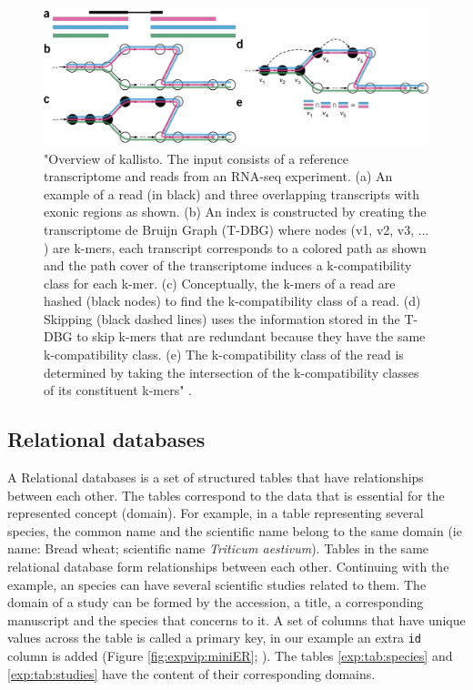 \begin{figure}
\includegraphics[width=1\textwidth]{LitReview/Figures/kallisto.pdf}
\caption[Overview of kallisto.]{"Overview of kallisto. The input consists of a reference transcriptome and reads from an RNA-seq experiment. (a) An example of a read (in black) and three overlapping transcripts with exonic regions as shown. (b) An index is constructed by creating the transcriptome de Bruijn Graph (T-DBG) where
nodes (v1, v2, v3, ... ) are k-mers, each transcript corresponds to a colored path as shown and the path cover of the transcriptome induces a k-compatibility class for each k-mer. (c) Conceptually, the k-mers of a read are hashed (black nodes) to find the k-compatibility class of a read. (d) Skipping (black dashed lines) uses the information stored in the T-DBG to skip k-mers that are redundant because they have the same k-compatibility class. (e) The k-compatibility class of the read is determined by taking the intersection of the k-compatibility classes of its constituent k-mers" \citep{Bray2016}.}
\label{fig:exp:kallisto}
\end{figure}


\subsection{Relational databases}
A Relational databases is a set of structured tables that have relationships between each other. 
The tables correspond to the data that is essential for the represented concept (domain).
For example, in a table representing several species, the common name and the scientific name belong to the same domain (ie name: Bread wheat; scientific name \textit{Triticum aestivum}). 
Tables in the same relational database form relationships between each other. 
Continuing with the example, an species can have several scientific studies related to them. 
The domain of a study can be formed by the accession, a title, a corresponding manuscript and the species that concerns to it. 
A set of columns that have unique values across the table is called a primary key, in our example an extra \texttt{id} column is added (Figure \ref{fig:expvip:miniER}; \citealt{Codd1970}).
The tables \ref{exp:tab:species} and \ref{exp:tab:studies} have the content of their corresponding domains. 

